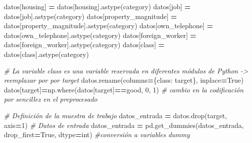 \documentclass[
  a4paper,
  DIV=11,
  numbers=noendperiod]{scrreprt}
\newenvironment{Shaded}{\begin{snugshade}}{\end{snugshade}}
\newcommand{\BuiltInTok}[1]{#1}
\newcommand{\CommentTok}[1]{\textcolor[rgb]{0.56,0.35,0.01}{\textit{#1}}}
\newcommand{\DecValTok}[1]{\textcolor[rgb]{0.00,0.00,0.81}{#1}}
\newcommand{\NormalTok}[1]{#1}
\newcommand{\OperatorTok}[1]{\textcolor[rgb]{0.81,0.36,0.00}{\textbf{#1}}}
\newcommand{\StringTok}[1]{\textcolor[rgb]{0.31,0.60,0.02}{#1}}
\newcommand{\VariableTok}[1]{\textcolor[rgb]{0.00,0.00,0.00}{#1}}
\begin{document}
\begin{Shaded}
\begin{Highlighting}[numbers=left,,]
\NormalTok{datos[}\StringTok{\textquotesingle{}housing\textquotesingle{}}\NormalTok{] }\OperatorTok{=}\NormalTok{ datos[}\StringTok{\textquotesingle{}housing\textquotesingle{}}\NormalTok{].astype(}\StringTok{\textquotesingle{}category\textquotesingle{}}\NormalTok{)}
\NormalTok{datos[}\StringTok{\textquotesingle{}job\textquotesingle{}}\NormalTok{] }\OperatorTok{=}\NormalTok{ datos[}\StringTok{\textquotesingle{}job\textquotesingle{}}\NormalTok{].astype(}\StringTok{\textquotesingle{}category\textquotesingle{}}\NormalTok{)}
\NormalTok{datos[}\StringTok{\textquotesingle{}property\_magnitude\textquotesingle{}}\NormalTok{] }\OperatorTok{=}\NormalTok{ datos[}\StringTok{\textquotesingle{}property\_magnitude\textquotesingle{}}\NormalTok{].astype(}\StringTok{\textquotesingle{}category\textquotesingle{}}\NormalTok{)}
\NormalTok{datos[}\StringTok{\textquotesingle{}own\_telephone\textquotesingle{}}\NormalTok{] }\OperatorTok{=}\NormalTok{ datos[}\StringTok{\textquotesingle{}own\_telephone\textquotesingle{}}\NormalTok{].astype(}\StringTok{\textquotesingle{}category\textquotesingle{}}\NormalTok{)}
\NormalTok{datos[}\StringTok{\textquotesingle{}foreign\_worker\textquotesingle{}}\NormalTok{] }\OperatorTok{=}\NormalTok{ datos[}\StringTok{\textquotesingle{}foreign\_worker\textquotesingle{}}\NormalTok{].astype(}\StringTok{\textquotesingle{}category\textquotesingle{}}\NormalTok{)}
\NormalTok{datos[}\StringTok{\textquotesingle{}class\textquotesingle{}}\NormalTok{] }\OperatorTok{=}\NormalTok{ datos[}\StringTok{\textquotesingle{}class\textquotesingle{}}\NormalTok{].astype(}\StringTok{\textquotesingle{}category\textquotesingle{}}\NormalTok{)}

\CommentTok{\# La variable class es una variable reservada en diferentes módulos de Python {-}\textgreater{} reemplazar por por target}
\NormalTok{datos.rename(columns}\OperatorTok{=}\NormalTok{\{}\StringTok{\textquotesingle{}class\textquotesingle{}}\NormalTok{: }\StringTok{\textquotesingle{}target\textquotesingle{}}\NormalTok{\}, inplace}\OperatorTok{=}\VariableTok{True}\NormalTok{)}
\NormalTok{datos[}\StringTok{\textquotesingle{}target\textquotesingle{}}\NormalTok{]}\OperatorTok{=}\NormalTok{np.where(datos[}\StringTok{\textquotesingle{}target\textquotesingle{}}\NormalTok{]}\OperatorTok{==}\StringTok{\textquotesingle{}good\textquotesingle{}}\NormalTok{, }\DecValTok{0}\NormalTok{, }\DecValTok{1}\NormalTok{) }\CommentTok{\# cambio en la codificación por sencillez en el preprocesado}

\CommentTok{\# Definición de la muestra de trabajo}
\NormalTok{datos\_entrada }\OperatorTok{=}\NormalTok{ datos.drop(}\StringTok{\textquotesingle{}target\textquotesingle{}}\NormalTok{, axis}\OperatorTok{=}\DecValTok{1}\NormalTok{) }\CommentTok{\# Datos de entrada}
\NormalTok{datos\_entrada }\OperatorTok{=}\NormalTok{ pd.get\_dummies(datos\_entrada, drop\_first}\OperatorTok{=}\VariableTok{True}\NormalTok{, dtype}\OperatorTok{=}\BuiltInTok{int}\NormalTok{) }\CommentTok{\#conversión a variables dummy}


\end{Highlighting}
\end{Shaded}
\end{document}
